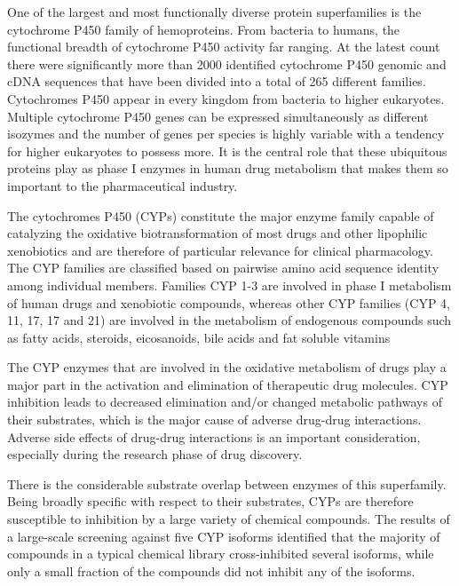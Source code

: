 One of the largest and most functionally diverse protein superfamilies is the cytochrome P450 family of hemoproteins. From bacteria to humans, the functional breadth of cytochrome P450 activity far ranging. At the latest count there were significantly more than 2000 identified cytochrome P450 genomic and cDNA sequences that have been divided into a total of 265 different families.\cite{Danielson2002} Cytochromes P450 appear in every kingdom from bacteria to higher eukaryotes. Multiple cytochrome P450 genes can be expressed simultaneously as different isozymes and the number of genes per species is highly variable with a tendency for higher eukaryotes to possess more. It is the central role that these ubiquitous proteins play as phase I enzymes in human drug metabolism that makes them so important to the pharmaceutical industry.
 
The cytochromes P450 (CYPs) constitute the major enzyme family capable of catalyzing the oxidative biotransformation of most drugs and other lipophilic xenobiotics and are therefore of particular relevance for clinical pharmacology.\cite{Nelson2004, Guengerich2008, Zanger2008} The CYP families are classified based on pairwise amino acid sequence identity among individual members. Families CYP 1-3 are involved in phase I metabolism of human drugs and xenobiotic compounds, whereas other CYP families (CYP 4, 11, 17, 17 and 21) are involved in the metabolism of endogenous compounds such as fatty acids, steroids, eicosanoids, bile acids and fat soluble vitamins\cite{Singh2011}

The CYP enzymes that are involved in the oxidative metabolism of drugs play a major part in the activation and elimination of therapeutic drug molecules. CYP inhibition leads to decreased elimination and/or changed metabolic pathways of their substrates, which is the major cause of adverse drug-drug interactions.\cite{Lapins2013} Adverse side effects of drug-drug interactions is an important consideration, especially during the research phase of drug discovery.\cite{Cheng2011}


There is the considerable substrate overlap between enzymes of this superfamily. Being broadly specific with respect to their substrates, CYPs are therefore susceptible to inhibition by a large variety of chemical compounds. The results of a large-scale screening against five CYP isoforms identified that the majority of compounds in a typical chemical library cross-inhibited several isoforms, while only a small fraction of the compounds did not inhibit any of the isoforms.\cite{Veith2009}


